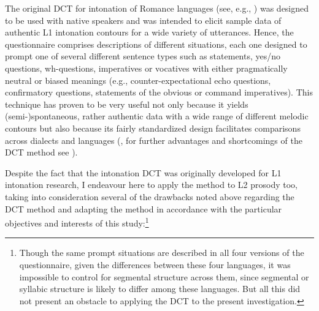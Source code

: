 The original DCT for intonation of Romance languages (see, e.g., \citealt{PrietoRoseano2009-2013, FrotaPrieto2015}) was designed to be used with native speakers and was intended to elicit sample data of authentic L1 intonation contours for a wide variety of utterances. Hence, the questionnaire comprises descriptions of different situations, each one designed to prompt one of several different sentence types such as statements, yes/no questions, wh-questions, imperatives or vocatives with either pragmatically neutral or biased meanings (e.g., counter-expectational echo questions, confirmatory questions, statements of the obvious or command imperatives). This technique has proven to be very useful not only because it yields (semi\nobreakdash-)spontaneous, rather authentic data with a wide range of different melodic contours but also because its fairly standardized design facilitates comparisons across dialects and languages (\citealt[392]{FrotaPrieto2015}, for further advantages and shortcomings of the DCT method see \citealt{VanrellEtAl2018}).\largerpage[2]



Despite the fact that the intonation DCT was originally developed for L1 intonation research, I endeavour here to apply the method to L2 prosody too, taking into consideration several of the drawbacks noted above regarding the DCT method and adapting the method in accordance with the particular objectives and interests of this study:\footnote{Though the same prompt situations are described in all four versions of the questionnaire, given the differences between these four languages, it was impossible to control for segmental structure across them, since segmental or syllabic structure is likely to differ among these languages. But all this did not present an obstacle to applying the DCT to the present investigation.}\pagebreak



